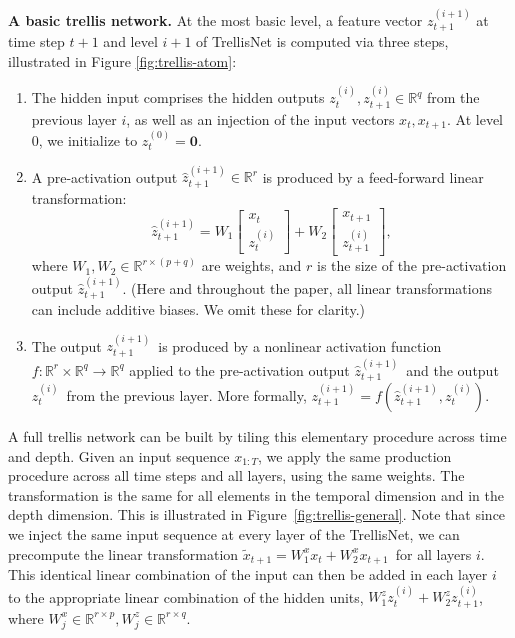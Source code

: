 \documentclass{article} \usepackage{iclr2019_conference,times}
\newcommand\mypara[1]{\vspace{0mm}\noindent\textbf{#1}}
\newcommand{\model}{TrellisNet}
\begin{document}
\mypara{A basic trellis network.}
At the most basic level, a feature vector $z_{t+1}^{(i+1)}$ at time step $t+1$ and level $i+1$ of TrellisNet is computed via three steps, illustrated in Figure \ref{fig:trellis-atom}:
\vspace{-3mm}
\begin{enumerate}[labelsep=*,leftmargin=1pc]
    \item
    The hidden input comprises the hidden outputs $z_t^{(i)}, z_{t+1}^{(i)} \in \mathbb{R}^q$ from the previous layer $i$, as well as an injection of the input vectors $x_t, x_{t+1}$.
    At level $0$, we initialize to $z_t^{(0)} = \mathbf{0}$.
    \item
    A pre-activation output $\hat{z}_{t+1}^{(i+1)} \in \mathbb{R}^r$ is produced by a feed-forward linear transformation:
    \begin{equation}
    \label{eq:trellis-atom}
    \hat{z}_{t+1}^{(i+1)} = W_1 \begin{bmatrix}x_t \\ z_t^{(i)}\end{bmatrix} + W_2 \begin{bmatrix}x_{t+1} \\ z_{t+1}^{(i)}\end{bmatrix},
    \end{equation}
    where $W_1, W_2 \in \mathbb{R}^{r \times (p+q)}$ are weights, and $r$ is the size of the pre-activation output $\hat{z}_{t+1}^{(i+1)}$. (Here and throughout the paper, all linear transformations can include additive biases. We omit these for clarity.)
    \item
    The output \small$z_{t+1}^{(i+1)}$\normalsize~is produced by a nonlinear activation function $f: \mathbb{R}^{r} \times \mathbb{R}^q \rightarrow \mathbb{R}^q$ applied to the pre-activation output \small$\hat{z}_{t+1}^{(i+1)}$\normalsize~and the output \small$z_t^{(i)}$\normalsize~from the previous layer. More formally, \small$z_{t+1}^{(i+1)} = f\left(\hat{z}_{t+1}^{(i+1)}, z_t^{(i)}\right)$\normalsize.
\end{enumerate}

A full trellis network can be built by tiling this elementary procedure across time and depth. Given an input sequence $x_{1:T}$, we apply the same production procedure across all time steps and all layers, using the same weights. The transformation is the same for all elements in the temporal dimension and in the depth dimension. This is illustrated in Figure~\ref{fig:trellis-general}. Note that since we inject the same input sequence at every layer of the \model, we can precompute the linear transformation \small${\tilde{x}_{t+1} = W_1^xx_t + W_2^xx_{t+1}}$\normalsize~for all layers $i$. This identical linear combination of the input can then be added in each layer $i$ to the appropriate linear combination of the hidden units, \small$W_1^zz_t^{(i)} + W_2^zz_{t+1}^{(i)}$\normalsize, where \small$W_j^x \in \mathbb{R}^{r \times p}, W_j^z \in \mathbb{R}^{r \times q}$\normalsize.
\end{document}
